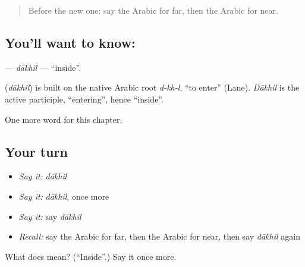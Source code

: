 \begin{quote}
Before the new one: say the Arabic for far, then the Arabic for near.
\end{quote}

\subsection*{You'll want to know: }
\textbf{} — \emph{dākhil} — \textquotedblleft{}inside\textquotedblright{}.

\begin{cousinweb}
\textbf{} (\emph{dākhil}) is built on the native Arabic root \emph{d-kh-l}, \textquotedblleft{}to enter\textquotedblright{} (Lane). \emph{Dākhil} is the active participle, \textquotedblleft{}entering\textquotedblright{}, hence \textquotedblleft{}inside\textquotedblright{}.
\end{cousinweb}

\begin{grammarlens}[title={What you've built}]
One more word for this chapter.
\end{grammarlens}

\subsection*{Your turn}
\begin{itemize}
\raggedright
  \item \emph{Say it:} \emph{dākhil}
  \item \emph{Say it:} \emph{dākhil}, once more
  \item \emph{Say it:} say \emph{dākhil}
  \item \emph{Recall:} say the Arabic for far, then the Arabic for near, then say \emph{dākhil} again
\end{itemize}

\begin{tcolorbox}[breakable,colback=teal!4,colframe=teal!35!black,title={Before you move on}]
What does  mean? (\textquotedblleft{}Inside\textquotedblright{}.) Say it once more.
\end{tcolorbox}
